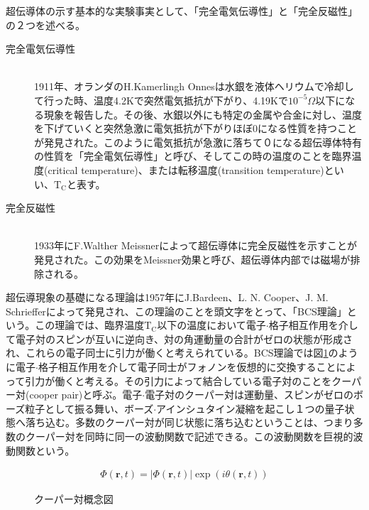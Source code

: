 超伝導体の示す基本的な実験事実として、「完全電気伝導性」と「完全反磁性」の２つを述べる。
	\begin{description}
	\item[完全電気伝導性]\mbox{}\\
		1911年、オランダのH.Kamerlingh Onnesは水銀を液体ヘリウムで冷却して行った時、温度4.2Kで突然電気抵抗が下がり、4.19Kで$10^{-5} \Omega$以下になる現象を報告した。その後、水銀以外にも特定の金属や合金に対し、温度を下げていくと突然急激に電気抵抗が下がりほぼ0になる性質を持つことが発見された。このように電気抵抗が急激に落ちて０になる超伝導体特有の性質を「完全電気伝導性」と呼び、そしてこの時の温度のことを臨界温度(critical temperature)、または転移温度(transition temperature)といい、$\mathrm{T_C}$と表す。
	\item[完全反磁性]\mbox{}\\
		1933年にF.Walther Meissnerによって超伝導体に完全反磁性を示すことが発見された。この効果をMeissner効果と呼び、超伝導体内部では磁場が排除される。
	\end{description}
	
超伝導現象の基礎になる理論は1957年にJ.Bardeen、L. N. Cooper、J. M. Schriefferによって発見され、この理論のことを頭文字をとって、「BCS理論」という。この理論では、臨界温度$\mathrm{T_C}$以下の温度において電子$\cdot$格子相互作用を介して電子対のスピンが互いに逆向き、対の角運動量の合計がゼロの状態が形成され、これらの電子同士に引力が働くと考えられている。BCS理論では図\ref{fig:CooperPair}のように電子$\cdot$格子相互作用を介して電子同士がフォノンを仮想的に交換することによって引力が働くと考える。その引力によって結合している電子対のことをクーパー対(cooper pair)と呼ぶ。電子$\cdot$電子対のクーパー対は運動量、スピンがゼロのボーズ粒子として振る舞い、ボーズ$\cdot$アインシュタイン凝縮を起こし１つの量子状態へ落ち込む。多数のクーパー対が同じ状態に落ち込むということは、つまり多数のクーパー対を同時に同一の波動関数で記述できる。この波動関数を巨視的波動関数という。

\begin{eqnarray}
\Phi (\bm{r},t) = |\Phi (\bm{r},t)| \exp (i \theta (\bm{r},t))
\end{eqnarray}

\begin{figure}[htbp]
  \begin{center}
    \caption{クーパー対概念図}
    \label{fig:CooperPair}
  \end{center}
\end{figure}

